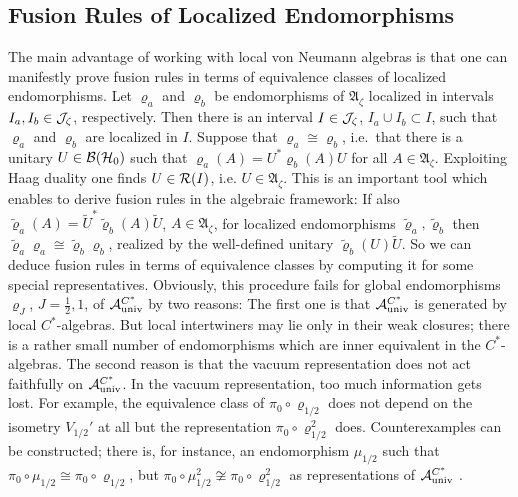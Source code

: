 \documentclass[10pt,a4paper]{article}
\begin{document}
\subsection{Fusion Rules of Localized Endomorphisms}
The main advantage of working with local von Neumann
algebras is that one can manifestly prove fusion
rules in terms of equivalence classes of localized
endomorphisms. Let $\varrho_a$ and $\varrho_b$ be
endomorphisms of $\mathfrak{A}_\zeta$ localized in
intervals $I_a,I_b\in{\cal J}_\zeta$, respectively.
Then there is an interval $I\in{\cal J}_\zeta$,
$I_a\cup I_b\subset I$, such that $\varrho_a$ and
$\varrho_b$ are localized in $I$. Suppose that
$\varrho_a\cong\varrho_b$, i.e.~that there is a
unitary $U\in{\cal B}({\cal H}_0)$ such that
$\varrho_a(A)=U^*\varrho_b(A)U$ for all
$A\in\mathfrak{A}_\zeta$. Exploiting Haag duality one
finds $U\in{\cal R}(I)$, i.e. $U\in\mathfrak{A}_\zeta$.
This is an important tool which enables to derive
fusion rules in the algebraic framework:
If also $\tilde{\varrho}_a(A)=
\tilde{U}^*\tilde{\varrho}_b(A)\tilde{U}$,
$A\in\mathfrak{A}_\zeta$, for localized endomorphisms
$\tilde{\varrho}_a,\tilde{\varrho}_b$ then
$\tilde{\varrho}_a\varrho_a\cong\tilde{\varrho}_b
\varrho_b$, realized by the well-defined unitary
$\tilde{\varrho}_b(U)\tilde{U}$. So we can deduce
fusion rules in terms of equivalence classes by
computing it for some special representatives.
Obviously, this procedure fails for global
endomorphisms $\varrho_J$, $J=\frac{1}{2},1$,
of ${\cal A}_{\rm univ}^{C^*}$ by two reasons:
The first one is that ${\cal A}_{\rm univ}^{C^*}$
is generated by local $C^*$-algebras. But local
intertwiners may lie only in their weak closures;
there is a rather small number of endomorphisms
which are inner equivalent in the $C^*$-algebras.
The second reason is that the vacuum representation
does not act faithfully on ${\cal A}_{\rm univ}^{C^*}$.
In the vacuum representation, too much information gets
lost. For example, the equivalence class of
$\pi_0\circ\varrho_{1/2}$ does not depend on the
isometry $V_{1/2}'$ at all but the representation
$\pi_0\circ\varrho_{1/2}^2$ does.
Counterexamples can be constructed; there is, for
instance, an endomorphism $\mu_{1/2}$ such that
$\pi_0\circ\mu_{1/2}\cong\pi_0\circ\varrho_{1/2}$,
but $\pi_0\circ\mu_{1/2}^2\not\cong
\pi_0\circ\varrho_{1/2}^2$ as representations
of ${\cal A}_{\rm univ}^{C^*}$ \cite{ich}.
\end{document}
